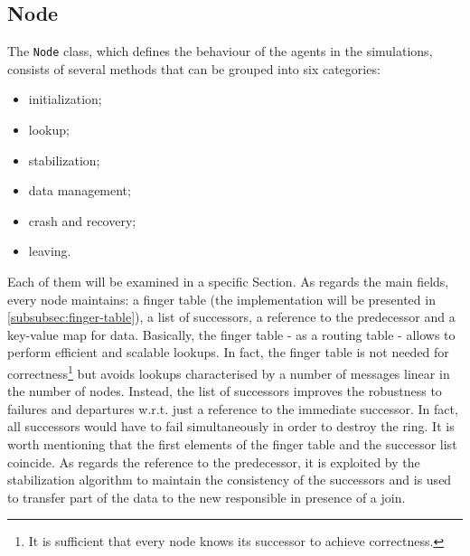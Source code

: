 \documentclass[11pt,twocolumn,letterpaper]{article}
\begin{document}
	
	\subsection{Node}
	\label{subsec:node}
	The \texttt{Node} class, which defines the behaviour of the agents in the simulations, consists of several methods that can be grouped into six categories:
	\vspace{-2pt}
	\begin{itemize}
		\itemsep0pt
		\item initialization;
		\item lookup;
		\item stabilization;
		\item data management;
		\item crash and recovery;
		\item leaving.
	\end{itemize}
	\vspace{-1pt}
	Each of them will be examined in a specific Section. As regards the main fields, every node maintains: a finger table (the implementation will be presented in \cref{subsubsec:finger-table}), a list of successors, a reference to the predecessor and a key-value map for data. \newline
	Basically, the finger table - as a routing table - allows to perform efficient and scalable lookups. In fact, the finger table is not needed for correctness\footnote{It is sufficient that every node knows its successor to achieve correctness.} but avoids lookups characterised by a number of messages linear in the number of nodes. \newline
	Instead, the list of successors improves the robustness to failures and departures w.r.t. just a reference to the immediate successor. In fact, all successors would have to fail simultaneously in order to destroy the ring. It is worth mentioning that the first elements of the finger table and the successor list coincide. \newline
	As regards the reference to the predecessor, it is exploited by the stabilization algorithm to maintain the consistency of the successors and is used to transfer part of the data to the new responsible in presence of a join.
	
\end{document}
